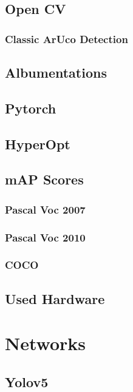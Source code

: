 \documentclass[10pt]{book}
\begin{document}
\section{Open CV}

\subsection{Classic ArUco Detection}

\section{Albumentations}

\section{Pytorch}

\section{HyperOpt}

\section{mAP Scores}

\subsection{Pascal Voc 2007}

\subsection{Pascal Voc 2010}

\subsection{COCO}

\section{Used Hardware}

\chapter{Networks}
\label{chap:netw}

\section{Yolov5}
\end{document}
